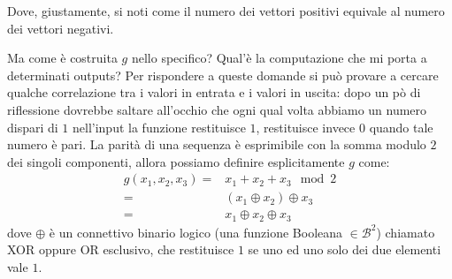 \documentclass[12pt,a4paper,openright]{report}
\newcommand*\xor{\mathbin{\oplus}}
\begin{document}
\begin{center}
\end{center}
Dove, giustamente, si noti come il numero dei vettori positivi equivale al numero dei vettori negativi.\par
Ma come è costruita $g$ nello specifico? Qual'è la computazione che mi porta a determinati outputs?
Per rispondere a queste domande si può provare a cercare qualche correlazione tra i valori in entrata e i valori in uscita:
dopo un pò di riflessione dovrebbe saltare all'occhio che ogni qual volta abbiamo un numero dispari di $1$ nell'input la funzione 
restituisce $1$, restituisce invece $0$ quando tale numero è pari.
La parità di una sequenza è esprimibile con la somma modulo $2$ dei singoli componenti, allora possiamo definire esplicitamente $g$ come:
\begin{align*}
    g(x_1, x_2, x_3)= &x_1 + x_2 + x_3 \mod 2  \\
                    = &(x_1 \xor x_2) \xor x_3  \\
                    = &x_1 \xor x_2 \xor x_3
\end{align*}
dove $\xor$ è un connettivo binario logico (una funzione Booleana $\in \mathcal{B}^2$) chiamato XOR oppure OR esclusivo, che restituisce $1$ se uno ed uno solo dei due 
elementi vale $1$. 
\end{document}
